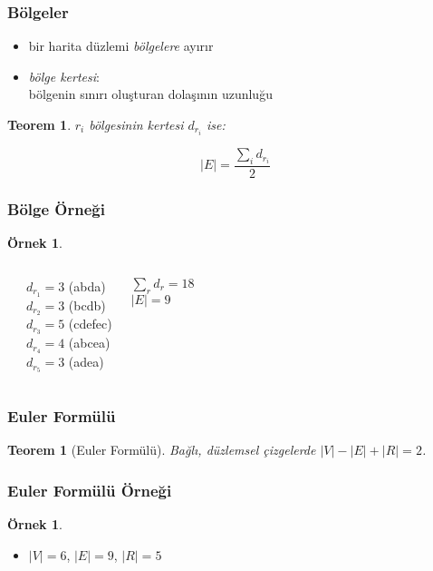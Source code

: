 \documentclass[dvipsnames]{beamer}
\theoremstyle{definition}
\theoremstyle{example}
\newtheorem{ornek}[theorem]{Örnek}
\theoremstyle{plain}
\newtheorem{teorem}[theorem]{Teorem}
\begin{document}
\begin{frame}
  \frametitle{Bölgeler}

  \begin{itemize}
    \item bir harita düzlemi \emph{bölgelere} ayırır
    \item \emph{bölge kertesi}:\\
      bölgenin sınırı oluşturan dolaşının uzunluğu
  \end{itemize}

  \pause
  \begin{teorem}
    $r_i$ bölgesinin kertesi $d_{r_i}$ ise:

    \[ |E| = \frac{\sum_i d_{r_i}}{2} \]
  \end{teorem}
\end{frame}

\begin{frame}
  \frametitle{Bölge Örneği}

  \begin{ornek}
    \begin{columns}
      \begin{center}
      \end{center}

      \pause
      $d_{r_1} = 3$ (abda)\\
      $d_{r_2} = 3$ (bcdb)\\
      $d_{r_3} = 5$ (cdefec)\\
      $d_{r_4} = 4$ (abcea)\\
      $d_{r_5} = 3$ (adea)

      \medskip
      $\sum_r d_r = 18$\\
      $|E| = 9$
    \end{columns}
  \end{ornek}
\end{frame}

\begin{frame}
  \frametitle{Euler Formülü}

  \begin{teorem}[Euler Formülü]
    Bağlı, düzlemsel çizgelerde $|V| - |E| + |R| = 2$.
  \end{teorem}
\end{frame}

\begin{frame}
  \frametitle{Euler Formülü Örneği}

  \begin{ornek}
    \begin{center}
    \end{center}

    \begin{itemize}
     \item $|V| = 6$, $|E| = 9$, $|R| = 5$
    \end{itemize}
  \end{ornek}
\end{frame}
\end{document}
